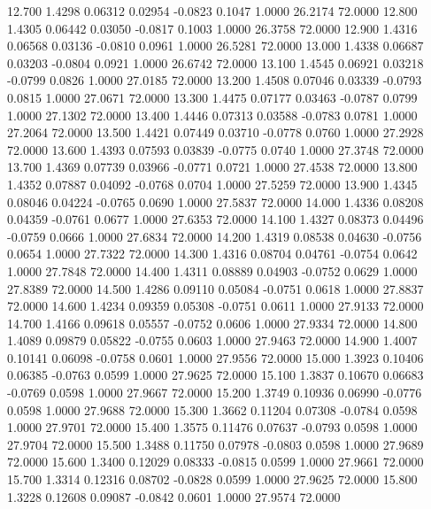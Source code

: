   12.700   1.4298   0.06312   0.02954  -0.0823   0.1047   1.0000  26.2174  72.0000
  12.800   1.4305   0.06442   0.03050  -0.0817   0.1003   1.0000  26.3758  72.0000
  12.900   1.4316   0.06568   0.03136  -0.0810   0.0961   1.0000  26.5281  72.0000
  13.000   1.4338   0.06687   0.03203  -0.0804   0.0921   1.0000  26.6742  72.0000
  13.100   1.4545   0.06921   0.03218  -0.0799   0.0826   1.0000  27.0185  72.0000
  13.200   1.4508   0.07046   0.03339  -0.0793   0.0815   1.0000  27.0671  72.0000
  13.300   1.4475   0.07177   0.03463  -0.0787   0.0799   1.0000  27.1302  72.0000
  13.400   1.4446   0.07313   0.03588  -0.0783   0.0781   1.0000  27.2064  72.0000
  13.500   1.4421   0.07449   0.03710  -0.0778   0.0760   1.0000  27.2928  72.0000
  13.600   1.4393   0.07593   0.03839  -0.0775   0.0740   1.0000  27.3748  72.0000
  13.700   1.4369   0.07739   0.03966  -0.0771   0.0721   1.0000  27.4538  72.0000
  13.800   1.4352   0.07887   0.04092  -0.0768   0.0704   1.0000  27.5259  72.0000
  13.900   1.4345   0.08046   0.04224  -0.0765   0.0690   1.0000  27.5837  72.0000
  14.000   1.4336   0.08208   0.04359  -0.0761   0.0677   1.0000  27.6353  72.0000
  14.100   1.4327   0.08373   0.04496  -0.0759   0.0666   1.0000  27.6834  72.0000
  14.200   1.4319   0.08538   0.04630  -0.0756   0.0654   1.0000  27.7322  72.0000
  14.300   1.4316   0.08704   0.04761  -0.0754   0.0642   1.0000  27.7848  72.0000
  14.400   1.4311   0.08889   0.04903  -0.0752   0.0629   1.0000  27.8389  72.0000
  14.500   1.4286   0.09110   0.05084  -0.0751   0.0618   1.0000  27.8837  72.0000
  14.600   1.4234   0.09359   0.05308  -0.0751   0.0611   1.0000  27.9133  72.0000
  14.700   1.4166   0.09618   0.05557  -0.0752   0.0606   1.0000  27.9334  72.0000
  14.800   1.4089   0.09879   0.05822  -0.0755   0.0603   1.0000  27.9463  72.0000
  14.900   1.4007   0.10141   0.06098  -0.0758   0.0601   1.0000  27.9556  72.0000
  15.000   1.3923   0.10406   0.06385  -0.0763   0.0599   1.0000  27.9625  72.0000
  15.100   1.3837   0.10670   0.06683  -0.0769   0.0598   1.0000  27.9667  72.0000
  15.200   1.3749   0.10936   0.06990  -0.0776   0.0598   1.0000  27.9688  72.0000
  15.300   1.3662   0.11204   0.07308  -0.0784   0.0598   1.0000  27.9701  72.0000
  15.400   1.3575   0.11476   0.07637  -0.0793   0.0598   1.0000  27.9704  72.0000
  15.500   1.3488   0.11750   0.07978  -0.0803   0.0598   1.0000  27.9689  72.0000
  15.600   1.3400   0.12029   0.08333  -0.0815   0.0599   1.0000  27.9661  72.0000
  15.700   1.3314   0.12316   0.08702  -0.0828   0.0599   1.0000  27.9625  72.0000
  15.800   1.3228   0.12608   0.09087  -0.0842   0.0601   1.0000  27.9574  72.0000
